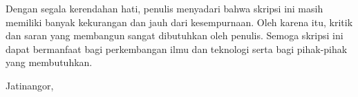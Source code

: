 Dengan segala kerendahan hati, penulis menyadari bahwa skripsi ini masih memiliki banyak kekurangan dan jauh dari kesempurnaan. Oleh karena itu, kritik dan saran yang membangun sangat dibutuhkan oleh penulis. Semoga skripsi ini dapat bermanfaat bagi perkembangan ilmu dan teknologi serta bagi pihak-pihak yang membutuhkan.

\vspace{1cm}
\begin{flushright}
	Jatinangor, \dateOf\\
	\vspace{0.5cm}
	\fullName
\end{flushright}